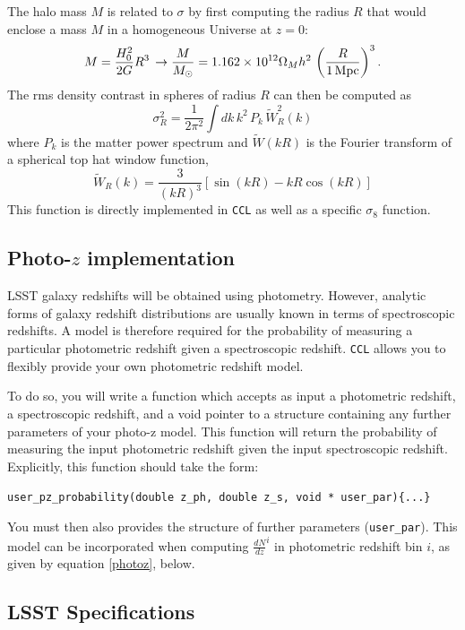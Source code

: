 \documentclass[\docopts]{\docclass}
\begin{document}
The halo mass $M$ is related to $\sigma$ by first computing the radius $R$ that would enclose a mass $M$ in a homogeneous Universe at $z=0$:
\begin{equation}
  M=\frac{H_0^2}{2G}R^3\,\rightarrow \frac{M}{M_\odot}=1.162\times10^{12}\Omega_Mh^2\,\left(\frac{R}{1\,{\rm Mpc}}\right)^3.
\end{equation}
The rms density contrast in spheres of radius $R$ can then be computed as
\begin{equation}
  \sigma_R^2 = \frac{1}{2\pi^2}\int dk\,k^2\,P_k\,\tilde{W}_R^2(k)
  \label{eq:sigR}
\end{equation}
where $P_k$ is the matter power spectrum and $\tilde{W}(kR)$ is the Fourier transform of a spherical top hat window function,
\begin{equation}
\tilde{W}_R(k) = \frac{3}{(kR)^3}[\sin(kR)-kR\cos(kR)]
\end{equation}
%
This function is directly implemented in {\tt CCL} as well as a specific $\sigma_8$ function.

\subsection{Photo-$z$ implementation}
\label{sec:photoz}
LSST galaxy redshifts will be obtained using photometry. However, analytic forms of galaxy redshift distributions are usually known in terms of spectroscopic redshifts. A model is therefore required for the probability of measuring a particular photometric redshift given a spectroscopic redshift. {\tt CCL} allows you to flexibly provide your own photometric redshift model.

To do so, you will write a function which accepts as input a photometric redshift, a spectroscopic redshift, and a void pointer to a structure containing any further parameters of your photo-z model. This function will return the probability of measuring the input photometric redshift given the input spectroscopic redshift. Explicitly, this function should take the form:

{\tt user\_pz\_probability(double z\_ph, double z\_s, void * user\_par)\{...\}}
 
You must then also provides the structure of further parameters ({\tt user\_par}). This model can be incorporated when computing $\frac{dN}{dz}^i$ in photometric redshift bin $i$, as given by equation \ref{photoz}, below.



\subsection{LSST Specifications}
\label{sec:specs}
\end{document}
